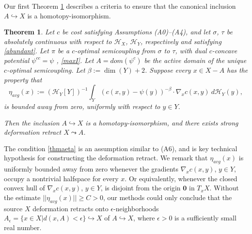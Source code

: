 \documentclass[12pt]{amsart}
\newtheorem{thm}{Theorem}
\theoremstyle{definition}
\theoremstyle{remark}
\newcommand{\sE}{\mathscr{E}}
\begin{document}
Our first Theorem \ref{A} describes a criteria to ensure that the canonical inclusion $A\hookrightarrow X$ is a homotopy-isomorphism.
\begin{thm}\label{A} 
Let $c$ be cost satisfying Assumptions (A0)--(A4), and let $\sigma$, $\tau$ be absolutely continuous with respect to $\mathscr{H}_X$, $\mathscr{H}_Y$, respectively and satisfying \eqref{abundant}. Let $\pi$ be a $c$-optimal semicoupling from $\sigma$ to $\tau$, with dual $c$-concave potential $\psi^{cc}=\psi$ , \ref{maxI}. Let $A=dom(\psi^c)$ be the active domain of the unique $c$-optimal semicoupling. Let $\beta:=\dim(Y)+2$. Suppose every $x\in X-A$ has the property that \begin{equation} \label{thmaeta}
\eta_{avg}(x):=(\mathscr{H}_Y[Y])^{-1} \int_{Y} (c(x,y)-\psi(y))^{-\beta}\cdot\nabla_x c(x,y) ~d\mathscr{H}_Y(y),  
\end{equation} is bounded away from zero, uniformly with respect to $y\in Y$. 

Then the inclusion $A \hookrightarrow X$ is a homotopy-isomorphism, and there exists strong deformation retract $X\leadsto A$. 
\end{thm}

The condition \eqref{thmaeta} is an assumption similar to (A6), and is key technical hypothesis for constructing the deformation retract. We remark that $\eta_{avg}(x)$ is uniformly bounded away from zero whenever the gradients $\nabla_x c(x,y)$, $y\in Y$, occupy a nontrivial halfspace for every $x$. Or equivalently, whenever the closed convex hull of $\nabla_x c(x,y)$, $y\in Y$, is disjoint from the origin $\textbf{0}$ in $T_x X$. Without the estimate $||\eta_{avg}(x)||\geq C >0$, our methods could only conclude that the source $X$ deformation retracts onto $\epsilon$-neighborhoods $A_\epsilon=\{x\in X| d(x,A) <\epsilon\} \hookrightarrow X$ of $A\hookrightarrow X$, where $\epsilon>0$ is a sufficiently small real number. 

%



\end{document}
